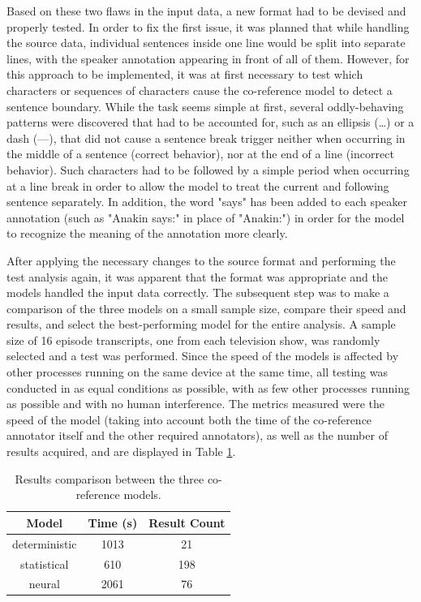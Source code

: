 \documentclass[a4paper, 11pt]{article}
\begin{document}
Based on these two flaws in the input data, a new format had to be devised and properly tested. In order to fix the first issue, it was planned that while handling the source data, individual sentences inside one line would be split into separate lines, with the speaker annotation appearing in front of all of them. However, for this approach to be implemented, it was at first necessary to test which characters or sequences of characters cause the co-reference model to detect a sentence boundary. While the task seems simple at first, several oddly-behaving patterns were discovered that had to be accounted for, such as an ellipsis (…) or a dash (—), that did not cause a sentence break trigger neither when occurring in the middle of a sentence (correct behavior), nor at the end of a line (incorrect behavior). Such characters had to be followed by a simple period when occurring at a line break in order to allow the model to treat the current and following sentence separately. In addition, the word "says" has been added to each speaker annotation (such as "Anakin says:" in place of "Anakin:") in order for the model to recognize the meaning of the annotation more clearly.

After applying the necessary changes to the source format and performing the test analysis again, it was apparent that the format was appropriate and the models handled the input data correctly. The subsequent step was to make a comparison of the three models on a small sample size, compare their speed and results, and select the best-performing model for the entire analysis. A sample size of 16 episode transcripts, one from each television show, was randomly selected and a test was performed. Since the speed of the models is affected by other processes running on the same device at the same time, all testing was conducted in as equal conditions as possible, with as few other processes running as possible and with no human interference. The metrics measured were the speed of the model (taking into account both the time of the co-reference annotator itself and the other required annotators), as well as the number of results acquired, and are displayed in Table \ref{tab:compmod}.

\begin{table}[h!]
\centering
  \begin{small}
  \begin{tabular}{|| c | c | c ||}
  \hline
  Model & Time (s) & Result Count \\
  \hline\hline
  deterministic & 1013 & 21 \\
  \hline
  statistical & 610 & 198 \\
  \hline
  neural & 2061 & 76 \\
  \hline
  \end{tabular}
  \end{small}
  \caption{Results comparison between the three co-reference models.}
  \label{tab:compmod}
\end{table}
\end{document}
